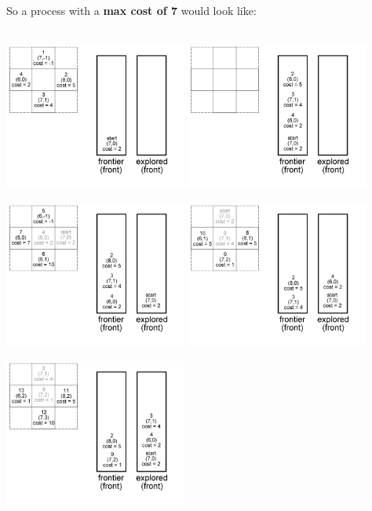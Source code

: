 \documentclass[12pt]{article}
\begin{document}
	So a process with a \textbf{max cost of 7} would look like: \\ \\
	\begin{center}
		\includegraphics[width=60mm]{images/icost/pos01.png}
		\includegraphics[width=60mm]{images/icost/pos02.png}
	\end{center}
	\begin{center}
		\includegraphics[width=60mm]{images/icost/pos03.png}
		\includegraphics[width=60mm]{images/icost/pos04.png}
	\end{center}
	\begin{center}
		\includegraphics[width=60mm]{images/icost/pos05.png}
	\end{center}
\end{document}
